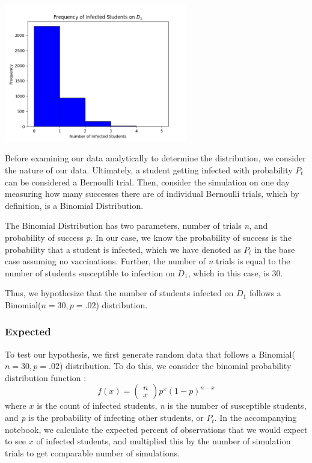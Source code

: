 \documentclass[
	letterpaper, %
]{jdf}
\begin{document}
\begin{jdffigure}
\includegraphics[height=6cm]{Figures/q1_hist.png}%
\end{jdffigure}

Before examining our data analytically to determine the distribution, we consider the nature of our data. Ultimately, a student getting infected with probability \(P_t\) can be considered a Bernoulli trial. Then, consider the simulation on one day measuring how many successes there are of individual Bernoulli trials, which by definition, is a Binomial Distribution. \citep{goldsman2020}

The Binomial Distribution has two parameters, number of trials \textit{n}, and probability of success \textit{p}. In our case, we know the probability of success is the probability that a student is infected, which we have denoted as \(P_{t}\) in the base case assuming no vaccinations. Further, the number of \textit{n} trials is equal to the number of students susceptible to infection on \(D_1\), which in this case, is 30. 

Thus, we hypothesize that the number of students infected on \(D_1\) follows a Binomial(\(n = 30, p = .02\)) distribution. 
\subsubsection{Expected}
To test our hypothesis, we first generate random data that follows a Binomial(\(n = 30, p = .02\)) distribution. To do this, we consider the binomial probability distribution function \citep{goldsman2020}:
\[f(x) = \left(\begin{array}{l}
n \\
x
\end{array}\right) p^x(1-p)^{n-x}\]
where \(x\) is the count of infected students, \textit{n} is the number of susceptible students, and \textit{p} is the probability of infecting other students, or \(P_t\). In the accompanying notebook, we calculate the expected percent of observations that we would expect to see \(x\) of infected students, and multiplied this by the number of simulation trials to get comparable number of simulations. 
\end{document}

